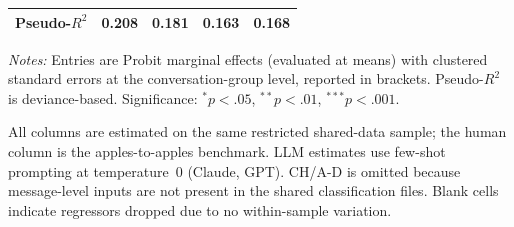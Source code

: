 \begin{table}[!htbp]
\begin{threeparttable}
\begin{tabular}{@{}l
  *{4}{S[table-format=-1.3, table-space-text-post={***}]}@{}}
  Pseudo-$R^2$
  & 0.208 & 0.181 & 0.163 & 0.168 \\
\bottomrule
\end{tabular}
\begin{minipage}{\textwidth}
\begin{tablenotes}[flushleft]
\scriptsize
\item \textit{Notes:} Entries are Probit marginal effects (evaluated at means) with clustered standard errors at the conversation-group level, reported in brackets. Pseudo-$R^2$ is deviance-based. Significance: $^{*}p<.05$, $^{**}p<.01$, $^{***}p<.001$.
\item All columns are estimated on the same restricted shared-data sample; the human column is the apples-to-apples benchmark. LLM estimates use few-shot prompting at temperature~0 (Claude, GPT). CH/A-D is omitted because message-level inputs are not present in the shared classification files. Blank cells indicate regressors dropped due to no within-sample variation.
\end{tablenotes}
\end{minipage}
\end{threeparttable}
\end{table}


